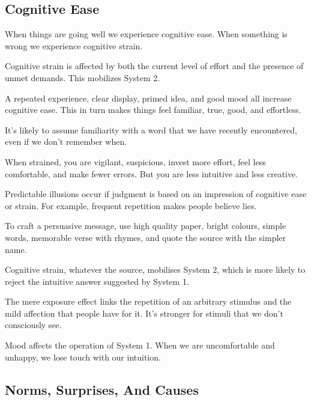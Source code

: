 \subsection*{Cognitive Ease}
\bit
\item When things are going well we experience cognitive ease. When something is wrong we experience cognitive strain.
\item Cognitive strain is affected by both the current level of effort and the presence of unmet demands. This
mobilizes System 2.
\item A repeated experience, clear display, primed idea, and good mood all increase cognitive ease. This in turn
makes things feel familiar, true, good, and effortless.
\item It’s likely to assume familiarity with a word that we have recently encountered, even if we don’t remember when.
\item When strained, you are vigilant, suspicious, invest more effort, feel less comfortable, and make fewer errors.
But you are less intuitive and less creative.
\item Predictable illusions occur if judgment is based on an impression of cognitive ease or strain. For example,
frequent repetition makes people believe lies.
\item To craft a persuasive message, use high quality paper, bright colours, simple words, memorable verse with
rhymes, and quote the source with the simpler name.
\item Cognitive strain, whatever the source, mobilises System 2, which is more likely to reject the intuitive answer
suggested by System 1.
\item The mere exposure effect links the repetition of an arbitrary stimulus and the mild affection that people have
for it. It's stronger for stimuli that we don't consciously see.
\item Mood affects the operation of System 1. When we are uncomfortable and unhappy, we lose touch with our intuition.
\eit

\subsection*{Norms, Surprises, And Causes}

